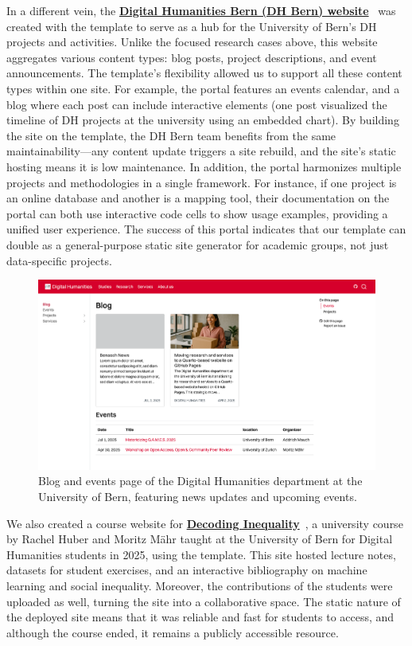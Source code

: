 \documentclass[final]{anthology-ch} %
\begin{document}
In a different vein, the \href{https://dhbern.github.io/}{\textbf{Digital Humanities Bern (DH Bern) website}}~\cite{digitalhumanitiesbern2025} was created with the template to serve as a hub for the University of Bern's DH projects and activities. Unlike the focused research cases above, this website aggregates various content types: blog posts, project descriptions, and event announcements. The template's flexibility allowed us to support all these content types within one site. For example, the portal features an events calendar, and a blog where each post can include interactive elements (one post visualized the timeline of DH projects at the university using an embedded chart). By building the site on the template, the DH Bern team benefits from the same maintainability---any content update triggers a site rebuild, and the site's static hosting means it is low maintenance. In addition, the portal harmonizes multiple projects and methodologies in a single framework. For instance, if one project is an online database and another is a mapping tool, their documentation on the portal can both use interactive code cells to show usage examples, providing a unified user experience. The success of this portal indicates that our template can double as a general-purpose static site generator for academic groups, not just data-specific projects.

\begin{figure}[t!]
  \centering
  \includegraphics[width=0.9\linewidth]{figures/dhbern.png}
  \caption{Blog and events page of the Digital Humanities department at the University of Bern, featuring news updates and upcoming events.}
  \label{fig-dh-bern}
\end{figure}

We also created a course website for \href{https://dhbern.github.io/decoding-inequality-2025/}{\textbf{Decoding Inequality}}~\cite{huber2024}, a university course by Rachel Huber and Moritz Mähr taught at the University of Bern for Digital Humanities students in 2025, using the template. This site hosted lecture notes, datasets for student exercises, and an interactive bibliography on machine learning and social inequality. Moreover, the contributions of the students were uploaded as well, turning the site into a collaborative space. The static nature of the deployed site means that it was reliable and fast for students to access, and although the course ended, it remains a publicly accessible resource.
\end{document}
